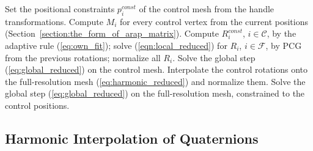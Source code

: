 \documentclass{birkjour}
\theoremstyle{remark}
\numberwithin{equation}{section}
\begin{document}
\begin{algorithm}[H]
\caption{One interactive frame. The Cholesky factorizations of Sections~\ref{section:global_step} and~\ref{section:harmonic_interpolation_rotors}, and that of the preconditioner $\mathrm C$ of Section~\ref{section:pcg}, are computed once per constraint set.}
\label{alg:frame}
\begin{algorithmic}[1]
\STATE Set the positional constraints $p^{const}_i$ of the control mesh from the handle transformations.
  \STATE Compute $M_i$ for every control vertex from the current positions (Section~\ref{section:the_form_of_arap_matrix}).
  \STATE Compute $R^{const}_i$, $i \in \mathcal C$, by the adaptive rule (\ref{eq:own_fit}); solve (\ref{eqn:local_reduced}) for $R_i$, $i \in \mathcal F$, by PCG from the previous rotations; normalize all $R_i$.
  \STATE Solve the global step (\ref{eq:global_reduced}) on the control mesh.
\ENDFOR
\STATE Interpolate the control rotations onto the full-resolution mesh (\ref{eq:harmonic_reduced}) and normalize them.
\STATE Solve the global step (\ref{eq:global_reduced}) on the full-resolution mesh, constrained to the control positions.
\end{algorithmic}
\end{algorithm}

\subsection{Harmonic Interpolation of Quaternions}
\label{section:harmonic_interpolation_rotors}
\end{document}
